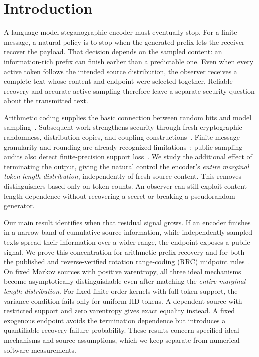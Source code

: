 \section{Introduction}

A language-model steganographic encoder must eventually stop. For a finite
message, a natural policy is to stop when the generated prefix lets the receiver
recover the payload. That decision depends on the sampled content: an
information-rich prefix can finish earlier than a predictable one. Even when
every active token follows the intended source distribution, the observer
receives a complete text whose content and endpoint were selected together.
Reliable recovery and accurate active sampling therefore leave a separate
security question about the transmitted text.

Arithmetic coding supplies the basic connection between random bits and model
sampling~\cite{ziegler2019neural,shen2020near}. Subsequent work strengthens security
through fresh cryptographic randomness, distribution copies, and coupling
constructions~\cite{kaptchuk2021language,ding2023discop,dewitt2024perfect}.
Finite-message granularity and rounding are already recognized
limitations~\cite{ding2023discop}; public sampling audits also detect
finite-precision support loss~\cite{cao2026lpv}. We study the additional effect of terminating
the output, giving the natural control the encoder's \emph{entire marginal
token-length distribution}, independently of fresh source content. This removes
distinguishers based only on token counts. An observer can still exploit content--length
dependence without recovering a secret or breaking a pseudorandom generator.

Our main result identifies when that residual signal grows. If an encoder finishes
in a narrow band of cumulative source information, while independently sampled
texts spread their information over a wider range, the endpoint exposes a
public signal. We prove this concentration for arithmetic-prefix recovery and
for both the published and reverse-verified rotation range-coding (RRC)
midpoint rules~\cite{yan2026rrc}. On fixed Markov sources with positive
varentropy, all three ideal mechanisms become asymptotically distinguishable
even after matching the \emph{entire marginal length distribution}. For fixed
finite-order kernels with full token support, the variance condition fails
only for uniform IID tokens. A dependent source with restricted support and
zero varentropy gives exact equality instead. A fixed
exogenous endpoint avoids the termination dependence but introduces a
quantifiable recovery-failure probability. These results concern specified
ideal mechanisms and source assumptions, which we keep separate from numerical
software measurements.

